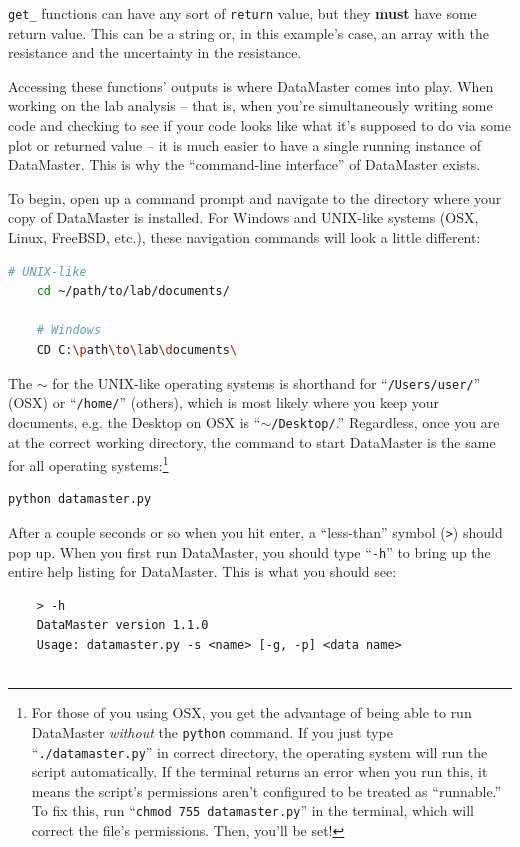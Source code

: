 \documentclass[12pt]{article}
\begin{document}
{\texttt{get\_} functions can have any sort of \texttt{return} value, but they \textbf{must} have some return value. This can be a string or, in this example's case, an array with the resistance and the uncertainty in the resistance.

Accessing these functions' outputs is where DataMaster comes into play. When working on the lab analysis -- that is, when you're simultaneously writing some code and checking to see if your code looks like what it's supposed to do via some plot or returned value -- it is much easier to have a single running instance of DataMaster. This is why the ``command-line interface'' of DataMaster exists.

To begin, open up a command prompt and navigate to the directory where your copy of DataMaster is installed. For Windows and UNIX-like systems (OSX, Linux, FreeBSD, etc.), these navigation commands will look a little different:
\begin{framed}
  \begin{lstlisting}[language=sh]
    # UNIX-like
    cd ~/path/to/lab/documents/
    
    # Windows
    CD C:\path\to\lab\documents\
  \end{lstlisting}
\end{framed}
The $\sim$ for the UNIX-like operating systems is shorthand for ``\texttt{/Users/user/}'' (OSX) or ``\texttt{/home/}'' (others), which is most likely where you keep your documents, e.g. the Desktop on OSX is ``\texttt{$\sim$/Desktop/}.'' Regardless, once you are at the correct working directory, the command to start DataMaster is the same for all operating systems:\footnote{\textsf{For those of you using OSX, you get the advantage of being able to run DataMaster \textit{without} the \texttt{python} command. If you just type ``\texttt{./datamaster.py}'' in correct directory, the operating system will run the script automatically. If the terminal returns an error when you run this, it means the script's permissions aren't configured to be treated as ``runnable.'' To fix this, run ``\texttt{chmod 755 datamaster.py}'' in the terminal, which will correct the file's permissions. Then, you'll be set!}}
\begin{framed}
  \begin{lstlisting}[language=sh]
    python datamaster.py
  \end{lstlisting}
\end{framed}
After a couple seconds or so when you hit enter, a ``less-than'' symbol (\texttt{>}) should pop up. When you first run DataMaster, you should type ``\texttt{-h}'' to bring up the entire help listing for DataMaster. This is what you should see:
\begin{framed}
  \begin{lstlisting}
    > -h
    DataMaster version 1.1.0
    Usage: datamaster.py -s <name> [-g, -p] <data name>
    

\end{lstlisting}
\end{framed}}
\end{document}
